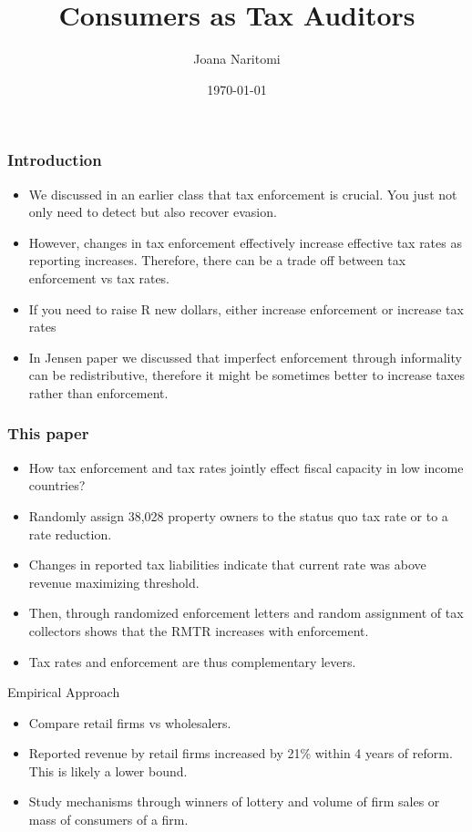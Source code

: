 \documentclass{beamer}
\title{Consumers as Tax Auditors}
\author{Joana Naritomi}
\date{\today}
\begin{document}
\frame{\titlepage}

\begin{frame}
\frametitle{Introduction}
\begin{itemize}
\item We discussed in an earlier class that tax enforcement is crucial. You just not only need to detect but also recover evasion. 
\item However, changes in tax enforcement effectively increase effective tax rates as reporting increases. Therefore, there can be a trade off between tax enforcement vs tax rates.
\item If you need to raise R new dollars, either increase enforcement or increase tax rates
\item In Jensen paper we discussed that imperfect enforcement through informality can be redistributive, therefore it might be sometimes better to increase taxes rather than enforcement.
\end{itemize}
\end{frame}

\begin{frame}
\frametitle{This paper}
\begin{itemize}
    \item How tax enforcement and tax rates jointly effect fiscal capacity in low income countries? 
    \item Randomly assign 38,028 property owners to the status quo tax rate or to a rate reduction.
    \item Changes in reported tax liabilities indicate that current rate was above revenue maximizing threshold. 
    \item Then, through randomized enforcement
letters and random assignment of tax collectors shows that the RMTR increases with enforcement. 
\item Tax rates and enforcement are thus complementary levers. 
  
\end{itemize}
\end{frame}

\begin{frame}{Empirical Approach}
\begin{itemize}
    \item Compare retail firms vs wholesalers. 
    \item Reported revenue by retail firms increased by 21\% within 4 years of reform. This is likely a lower bound.
    \item Study mechanisms through winners of lottery and volume of firm sales or mass of consumers of a firm. 
\end{itemize}
\end{frame}
\end{document}
